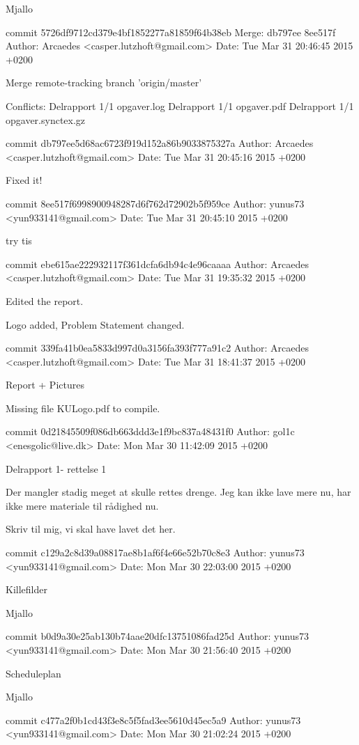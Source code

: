 \documentclass[12pt,a4paper]{article}
\begin{document}
Mjallo

commit 5726df9712cd379e4bf1852277a81859f64b38eb
Merge: db797ee 8ee517f
Author: Arcaedes <casper.lutzhoft@gmail.com>
Date:   Tue Mar 31 20:46:45 2015 +0200

Merge remote-tracking branch 'origin/master'

Conflicts:
Delrapport 1/1 opgaver.log
Delrapport 1/1 opgaver.pdf
Delrapport 1/1 opgaver.synctex.gz

commit db797ee5d68ac6723f919d152a86b9033875327a
Author: Arcaedes <casper.lutzhoft@gmail.com>
Date:   Tue Mar 31 20:45:16 2015 +0200

Fixed it!

commit 8ee517f6998900948287d6f762d72902b5f959ce
Author: yunus73 <yun933141@gmail.com>
Date:   Tue Mar 31 20:45:10 2015 +0200

try tis

commit ebe615ae222932117f361dcfa6db94c4e96caaaa
Author: Arcaedes <casper.lutzhoft@gmail.com>
Date:   Tue Mar 31 19:35:32 2015 +0200

Edited the report.

Logo added, Problem Statement changed.

commit 339fa41b0ea5833d997d0a3156fa393f777a91c2
Author: Arcaedes <casper.lutzhoft@gmail.com>
Date:   Tue Mar 31 18:41:37 2015 +0200

Report + Pictures

Missing file KULogo.pdf to compile.

commit 0d21845509f086db663ddd3e1f9bc837a48431f0
Author: gol1c <enesgolic@live.dk>
Date:   Mon Mar 30 11:42:09 2015 +0200

Delrapport 1- rettelse 1

Der mangler stadig meget at skulle rettes drenge. Jeg kan ikke lave mere
nu, har ikke mere materiale til rådighed nu.

Skriv til mig, vi skal have lavet det her.

commit c129a2c8d39a08817ae8b1af6f4e66e52b70c8e3
Author: yunus73 <yun933141@gmail.com>
Date:   Mon Mar 30 22:03:00 2015 +0200

Killefilder

Mjallo

commit b0d9a30e25ab130b74aae20dfc13751086fad25d
Author: yunus73 <yun933141@gmail.com>
Date:   Mon Mar 30 21:56:40 2015 +0200

Scheduleplan

Mjallo

commit c477a2f0b1cd43f3e8c5f5fad3ee5610d45ec5a9
Author: yunus73 <yun933141@gmail.com>
Date:   Mon Mar 30 21:02:24 2015 +0200
\end{document}
